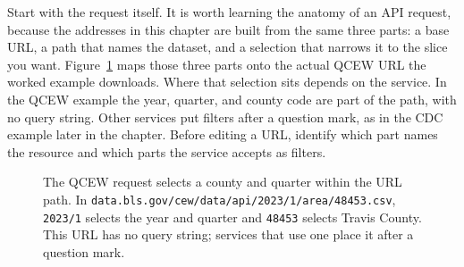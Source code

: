 Start with the request itself. It is worth learning the anatomy of an API request, because the addresses in this chapter are built from the same three parts: a base URL, a path that names the dataset, and a selection that narrows it to the slice you want. Figure~\ref{fig:ch03-viz-anatomy} maps those three parts onto the actual QCEW URL the worked example downloads. Where that selection sits depends on the service. In the QCEW example the year, quarter, and county code are part of the path, with no query string. Other services put filters after a question mark, as in the CDC example later in the chapter. Before editing a URL, identify which part names the resource and which parts the service accepts as filters.

\begin{figure}[htbp]
\centering
{}
\caption[Anatomy of an API request]{The QCEW request selects a county and quarter within the URL path. In \texttt{data.bls.gov/cew/data/api/2023/1/area/48453.csv}, \texttt{2023/1} selects the year and quarter and \texttt{48453} selects Travis County. This URL has no query string; services that use one place it after a question mark.}
\label{fig:ch03-viz-anatomy}
\end{figure}

